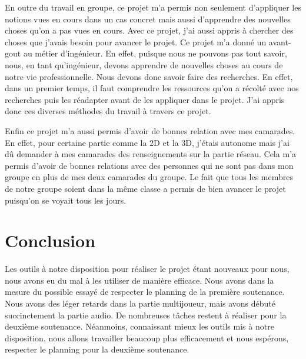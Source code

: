 \documentclass[a4paper, 12pt]{article}
\begin{document}
\par En outre du travail en groupe, ce projet m’a permis non seulement d’appliquer les notions vues en cours dans un cas concret mais aussi d’apprendre des nouvelles choses qu’on a pas vues en cours. Avec ce projet, j’ai aussi appris à chercher des choses que j’avais besoin pour avancer le projet. Ce projet m’a donné un avant-gout au métier d’ingénieur. En effet, puisque nous ne pouvons pas tout savoir, nous, en tant qu’ingénieur, devons apprendre de nouvelles choses au cours de notre vie professionnelle. Nous devons donc savoir faire des recherches. En effet, dans un premier temps, il faut comprendre les ressources qu’on a récolté avec nos recherches puis les réadapter avant de les appliquer dans le projet. J’ai appris donc ces diverses méthodes du travail à travers ce projet.
\medbreak
\par Enfin ce projet m’a aussi permis d’avoir de bonnes relation avec mes camarades. En effet, pour certaine partie comme la 2D et la 3D, j’étais autonome mais j’ai dû demander à mes camarades des renseignements sur la partie réseau.  Cela m’a permis d’avoir de bonnes relations avec des personnes qui ne sont pas dans mon groupe en plus de mes deux camarades du groupe. Le fait que tous les membres de notre groupe soient dans la même classe a permis de bien avancer le projet puisqu’on se voyait tous les jours.


\section{Conclusion}

Les outils à notre disposition pour réaliser le projet étant  nouveaux pour nous, nous avons eu du mal à les utiliser de manière efficace. Nous avons dans la mesure du possible essayé de respecter le planning de la première soutenance. Nous avons des l\'eger retards dans la partie multijoueur, mais avons d\'ebut\'e succinctement la partie audio. De nombreuses tâches restent à réaliser pour la deuxième soutenance. Néanmoins, connaissant mieux les outils mis à notre disposition, nous allons travailler beaucoup plus efficacement et nous espérons, respecter le planning pour la deuxième soutenance. 
\end{document}
